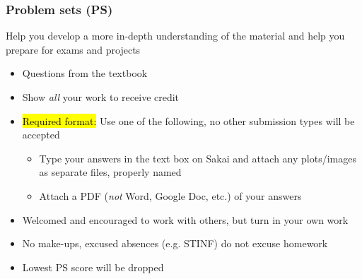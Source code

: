 \documentclass[slidestop,compress,mathserif,12pt,t,professionalfonts,xcolor=table]{beamer}
\begin{document}

\begin{frame}
\frametitle{Problem sets (PS)}

 Help you develop a more in-depth understanding of the material and help you prepare for exams and projects

\begin{itemize}

\item Questions from the textbook

\item Show \emph{all} your work to receive credit

\item \hl{Required format:} Use one of the following, no other submission types will be accepted
\begin{itemize}
\item Type your answers in the text box on Sakai and attach any plots/images as separate files, properly named
\item Attach a PDF (\emph{not} Word, Google Doc, etc.) of your answers
\end{itemize}

\item Welcomed and encouraged to work with others, but turn in your own work

\item No make-ups, excused absences (e.g. STINF) do not excuse homework

\item Lowest PS score will be dropped

\end{itemize}


\end{frame}

\end{document}
